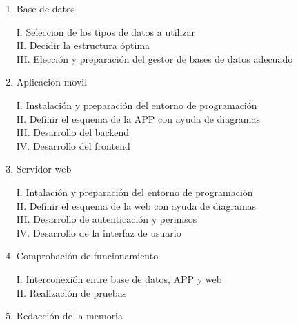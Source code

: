 \documentclass[12pt,oneside,a4paper]{article}
\begin{document}
\begin{enumerate}


\item    Base de datos \\
\begin{enumerate}
    I.   Seleccion de los tipos de datos a utilizar \\
    II. Decidir la estructura óptima\\
    III. Elección y preparación del gestor de bases de datos adecuado\\
\end{enumerate}
   
\item  Aplicacion movil\\
\begin{enumerate}
    I. Instalación y preparación del entorno de programación\\
    II. Definir el esquema de la APP con ayuda de diagramas\\
    III. Desarrollo del backend\\
    IV. Desarrollo del frontend\\
\end{enumerate}

\item  Servidor web\\
\begin{enumerate}
    I. Intalación y preparación del entorno de programación\\
    II. Definir el esquema de la web con ayuda de diagramas\\
    III. Desarrollo de autenticación y permisos\\
    IV. Desarrollo de la interfaz de usuario\\
\end{enumerate}

\item Comprobación de funcionamiento\\
\begin{enumerate}
    I. Interconexión entre base de datos, APP y web\\
    II. Realización de pruebas\\
\end{enumerate}

\item    Redacción de la memoria \\
\end{enumerate}  \\
\end{document}
